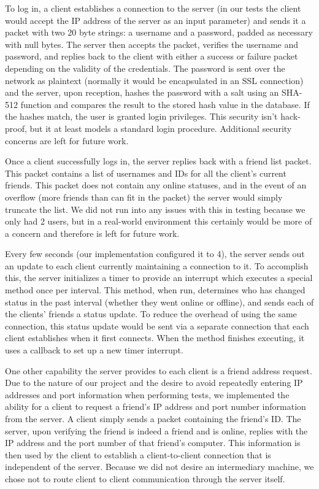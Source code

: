 To log in, a client establishes a connection to the server (in our tests
the client would accept the IP address of the server as an input parameter) and sends it
a packet with two 20 byte strings: a username and a password, padded as necessary with
null bytes. The server then accepts the packet, verifies the username and password, and
replies back to the client with either a success or failure packet depending on the
validity of the credentials. The password is sent over the network as plaintext (normally
it would be encapsulated in an SSL connection) and the server, upon reception, hashes
the password with a salt using an SHA-512 function and compares the result to the stored hash value 
in the database. If the hashes match, the user is granted login privileges. This
security isn't hack-proof, but it at least models a standard login procedure.  Additional
security concerns are left for future work.

Once a client successfully logs in, the server replies back with a friend list packet.
This packet contains a list of usernames and IDs for all the client's current
friends.
This packet does not contain any online statuses, and in the event of an overflow (more friends than can fit in the packet) the server would simply truncate
the list. We did not run into any issues with this in testing because we only had 2
users, but in a real-world environment this certainly would be more of a concern and 
therefore is left for future work.

Every few seconds (our implementation configured it to 4), the server sends out an
update to each client currently maintaining a connection to it. To accomplish this,
the server initializes a timer to provide an interrupt which executes a special method
once per interval. This method, when run, determines who has changed status in the past
interval (whether they went online or offline), and sends each of the clients' friends a 
status update. To reduce the overhead of using the same
connection, this status update would be sent via a separate connection that each client
establishes when it first connects. When the method finishes executing, it uses a callback
to set up a new timer interrupt. 

One other capability the server provides to each client is a friend address request. Due to
the nature of our project and the desire to avoid repeatedly entering IP
addresses and port information
when performing tests, we implemented the ability for a client to request a friend's IP 
address and port number
information from the server. A client simply sends a packet containing the
friend's ID. The server, upon verifying the friend is indeed a friend and is
online, replies with the IP address and the port number of that friend's computer. This information is then used
by the client to establish a client-to-client connection that is independent of the 
server. Because we did not desire an intermediary machine, we chose not to route client to client
communication through the server itself.

